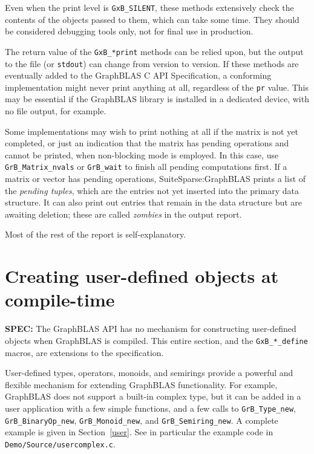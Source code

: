 \documentclass[12pt]{article}
\begin{document}
Even when the print level is \verb'GxB_SILENT', these methods extensively check
the contents of the objects passed to them, which can take some time.  They
should be considered debugging tools only, not for final use in production.

The return value of the \verb'GxB_*print' methods can be relied upon, but the
output to the file (or \verb'stdout') can change from version to version.  If
these methods are eventually added to the GraphBLAS C API Specification, a
conforming implementation might never print anything at all, regardless of the
\verb'pr' value.  This may be essential if the GraphBLAS library is installed
in a dedicated device, with no file output, for example.

Some implementations may wish to print nothing at all if the matrix is not yet
completed, or just an indication that the matrix has pending operations and
cannot be printed, when non-blocking mode is employed.  In this case, use
\verb'GrB_Matrix_nvals' or \verb'GrB_wait' to finish all pending computations
first.  If a matrix or vector has pending operations, SuiteSparse:GraphBLAS
prints a list of the {\em pending tuples}, which are the entries not yet
inserted into the primary data structure.  It can also print out entries that
remain in the data structure but are awaiting deletion; these are called {\em
zombies} in the output report.

Most of the rest of the report is self-explanatory.

\newpage
\section{Creating user-defined objects at compile-time} %
\label{precompile}

\begin{spec}
{\bf SPEC:} The GraphBLAS API has no mechanism for constructing user-defined
objects when GraphBLAS is compiled.  This entire section, and the
\verb'GxB_*_define' macros, are extensions to the specification.
\end{spec}

User-defined types, operators, monoids, and semirings provide a powerful and
flexible mechanism for extending GraphBLAS functionality.  For example,
GraphBLAS does not support a built-in complex type, but it can be added in a
user application with a few simple functions, and a few calls to
\verb'GrB_Type_new', \verb'GrB_BinaryOp_new', \verb'GrB_Monoid_new', and
\verb'GrB_Semiring_new'.  A complete example is given in Section~\ref{user}.
See in particular the example code in \verb'Demo/Source/usercomplex.c'.
\end{document}
